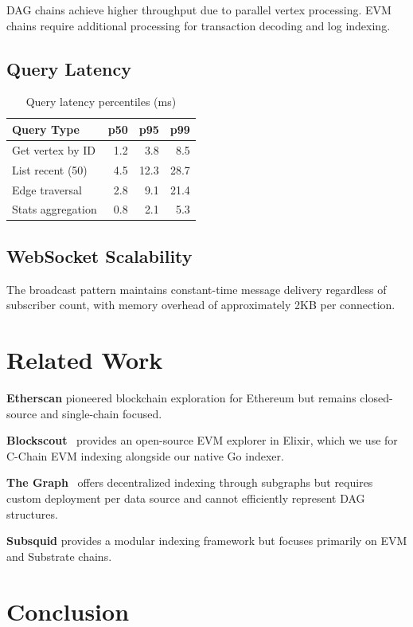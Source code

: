 \documentclass[11pt,twocolumn]{article}
\begin{document}
DAG chains achieve higher throughput due to parallel vertex processing. EVM chains require additional processing for transaction decoding and log indexing.

\subsection{Query Latency}

\begin{table}[h]
\centering
\caption{Query latency percentiles (ms)}
\begin{tabular}{@{}lrrr@{}}
\toprule
Query Type & p50 & p95 & p99 \\
\midrule
Get vertex by ID & 1.2 & 3.8 & 8.5 \\
List recent (50) & 4.5 & 12.3 & 28.7 \\
Edge traversal & 2.8 & 9.1 & 21.4 \\
Stats aggregation & 0.8 & 2.1 & 5.3 \\
\bottomrule
\end{tabular}
\label{tab:latency}
\end{table}

\subsection{WebSocket Scalability}

The broadcast pattern maintains constant-time message delivery regardless of subscriber count, with memory overhead of approximately 2KB per connection.

\section{Related Work}

\textbf{Etherscan} pioneered blockchain exploration for Ethereum but remains closed-source and single-chain focused.

\textbf{Blockscout}~\cite{blockscout} provides an open-source EVM explorer in Elixir, which we use for C-Chain EVM indexing alongside our native Go indexer.

\textbf{The Graph}~\cite{thegraph} offers decentralized indexing through subgraphs but requires custom deployment per data source and cannot efficiently represent DAG structures.

\textbf{Subsquid} provides a modular indexing framework but focuses primarily on EVM and Substrate chains.

\section{Conclusion}
\end{document}
